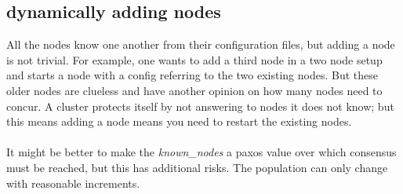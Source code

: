 \subsection{dynamically adding nodes}
All the nodes know one another from their configuration files,
but adding a node is not trivial. 
For example, one wants to add a third node in a two node setup and starts a node with a config referring to the two existing nodes. 
But these older nodes are clueless 
and have another opinion on how many nodes need to concur. 
A cluster protects itself by not answering to nodes it does not know; 
but this means adding a node means you need to restart the existing nodes.

\paragraph{}
It might be better to make the \emph{known\_nodes} a paxos value 
over which consensus must be reached, but this has additional risks.
The population can only change with reasonable increments.

